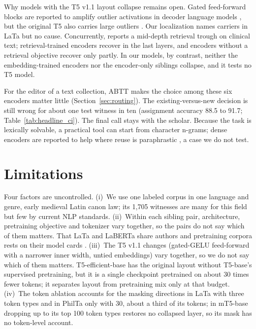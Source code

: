 \documentclass[11pt]{article}
\begin{document}
Why models with the T5 v1.1 layout collapse remains open.
Gated feed-forward blocks are reported to amplify outlier activations in decoder language models \citep{fishman2025fp8,yang2025activationspikes}, but the original T5 also carries large outliers \citep{zhao2025outlier}.
Our localization names carriers in LaTa but no cause.
Concurrently, \citet{mikkelsen2026clinical} reports a mid-depth retrieval trough on clinical text; retrieval-trained encoders recover in the last layers, and encoders without a retrieval objective recover only partly.
In our models, by contrast, neither the embedding-trained encoders nor the encoder-only siblings collapse, and it tests no T5 model.

For the editor of a text collection, ABTT makes the choice among these six encoders matter little (Section~\ref{sec:routing}).
The existing-versus-new decision is still wrong for about one test witness in ten (assignment accuracy 88.5 to 91.7; Table~\ref{tab:headline_ci}).
The final call stays with the scholar.
Because the task is lexically solvable, a practical tool can start from character n-grams; dense encoders are reported to help where reuse is paraphrastic \citep{delaselle2026transcription}, a case we do not test.

\clearpage
\section*{Limitations}

Four factors are uncontrolled.
(i)~We use one labeled corpus in one language and genre, early medieval Latin canon law; its 1,705 witnesses are many for this field but few by current NLP standards.
(ii)~Within each sibling pair, architecture, pretraining objective and tokenizer vary together, so the pairs do not say which of them matters.
That LaTa and LaBERTa share authors and pretraining corpora rests on their model cards \citep{lata2023card,laberta2023card}.
(iii)~The T5 v1.1 changes (gated-GELU feed-forward with a narrower inner width, untied embeddings) vary together, so we do not say which of them matters.
T5-efficient-base has the original layout without T5-base's supervised pretraining, but it is a single checkpoint pretrained on about 30 times fewer tokens; it separates layout from pretraining mix only at that budget.
(iv)~The token ablation accounts for the masking directions in LaTa with three token types and in PhilTa only with 30, about a third of its tokens; in mT5-base dropping up to its top 100 token types restores no collapsed layer, so its mask has no token-level account.
\end{document}
